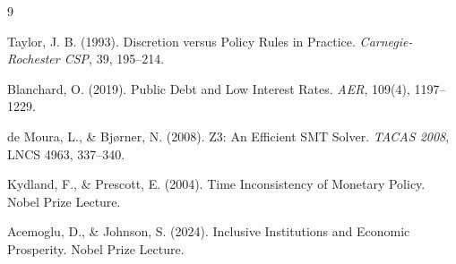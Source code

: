 \documentclass[12pt,a4paper]{article}
\begin{document}

\begin{thebibliography}{9}

 Taylor, J. B. (1993). Discretion versus Policy Rules in Practice. \textit{Carnegie-Rochester CSP}, 39, 195–214.

 Blanchard, O. (2019). Public Debt and Low Interest Rates. \textit{AER}, 109(4), 1197–1229.

 de Moura, L., \& Bjørner, N. (2008). Z3: An Efficient SMT Solver. \textit{TACAS 2008}, LNCS 4963, 337–340.

 Kydland, F., \& Prescott, E. (2004). Time Inconsistency of Monetary Policy. Nobel Prize Lecture.

 Acemoglu, D., \& Johnson, S. (2024). Inclusive Institutions and Economic Prosperity. Nobel Prize Lecture.

\end{thebibliography}
\end{document}
